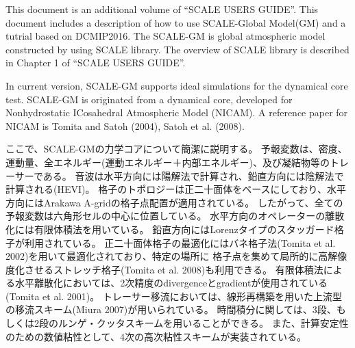 
This document is an additional volume of ``SCALE USERS GUIDE''.
This document includes a description of how to use SCALE-Global Model(GM) and a tutrial based on DCMIP2016.
The SCALE-GM is global atmospheric model constructed by using SCALE library.
The overview of SCALE library is described in Chapter 1 of ``SCALE USERS GUIDE''.

In current version, SCALE-GM supports ideal simulations for the dynamical core test.
SCALE-GM is originated from a dynamical core, developed for Nonhydrostatic ICosahedral Atmospheric Model (NICAM).
A reference paper for NICAM is
Tomita and Satoh (2004), Satoh et al. (2008).



ここで、SCALE-GMの力学コアについて簡潔に説明する。
予報変数は、密度、運動量、全エネルギー(運動エネルギー＋内部エネルギー)、及び凝結物等のトレーサーである。
音波は水平方向には陽解法で計算され、鉛直方向には陰解法で計算される(HEVI)。
格子のトポロジーは正二十面体をベースにしており、水平方向にはArakawa A-gridの格子点配置が適用されている。
したがって、全ての予報変数は六角形セルの中心に位置している。
水平方向のオペレーターの離散化には有限体積法を用いている。
鉛直方向にはLorenzタイプのスタッガード格子が利用されている。
正二十面体格子の最適化にはバネ格子法(Tomita et al. 2002)を用いて最適化されており、特定の場所に
格子点を集めて局所的に高解像度化させるストレッチ格子(Tomita et al. 2008)も利用できる。
有限体積法による水平離散化においては、2次精度のdivergenceとgradientが使用されている(Tomita et al. 2001)。
トレーサー移流においては、線形再構築を用いた上流型の移流スキーム(Miura 2007)が用いられている。
時間積分に関しては、3段、もしくは2段のルンゲ・クッタスキームを用いることができる。
また、計算安定性のための数値粘性として、4次の高次粘性スキームが実装されている。



